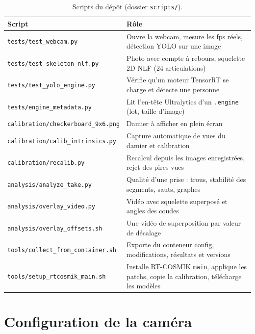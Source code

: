 \documentclass[11pt,a4paper]{article}
\newcommand{\code}[1]{\texttt{\small #1}}
\begin{document}
\begin{table}[H]
\centering
\small
\begin{tabularx}{\textwidth}{@{}lX@{}}
\toprule
\textbf{Script} & \textbf{Rôle} \\
\midrule
\code{tests/test\_webcam.py} & Ouvre la webcam, mesure les fps réels, détection YOLO sur une image \\
\code{tests/test\_skeleton\_nlf.py} & Photo avec compte à rebours, squelette 2D NLF (24 articulations) \\
\code{tests/test\_yolo\_engine.py} & Vérifie qu'un moteur TensorRT se charge et détecte une personne \\
\code{tests/engine\_metadata.py} & Lit l'en-tête Ultralytics d'un \code{.engine} (lot, taille d'image) \\
\code{calibration/checkerboard\_9x6.png} & Damier à afficher en plein écran \\
\code{calibration/calib\_intrinsics.py} & Capture automatique de vues du damier et calibration \\
\code{calibration/recalib.py} & Recalcul depuis les images enregistrées, rejet des pires vues \\
\code{analysis/analyze\_take.py} & Qualité d'une prise : trous, stabilité des segments, sauts, graphes \\
\code{analysis/overlay\_video.py} & Vidéo avec squelette superposé et angles des coudes \\
\code{analysis/overlay\_offsets.sh} & Une vidéo de superposition par valeur de décalage \\
\code{tools/collect\_from\_container.sh} & Exporte du conteneur config, modifications, résultats et versions \\
\code{tools/setup\_rtcosmik\_main.sh} & Installe RT-COSMIK \code{main}, applique les patchs, copie la calibration, télécharge les modèles \\
\bottomrule
\end{tabularx}
\caption{Scripts du dépôt (dossier \code{scripts/}).}
\end{table}

\section{Configuration de la caméra}
\end{document}
